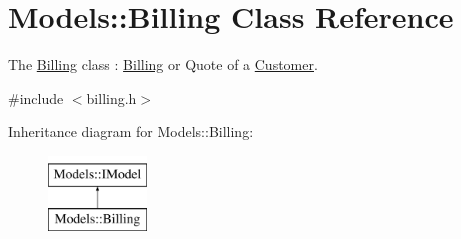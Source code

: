 \hypertarget{classModels_1_1Billing}{\section{Models\-:\-:Billing Class Reference}
\label{classModels_1_1Billing}
}


The \hyperlink{classModels_1_1Billing}{Billing} class \-: \hyperlink{classModels_1_1Billing}{Billing} or Quote of a \hyperlink{classModels_1_1Customer}{Customer}.  




{\ttfamily \#include $<$billing.\-h$>$}

Inheritance diagram for Models\-:\-:Billing\-:\begin{figure}[H]
\begin{center}
\leavevmode
\includegraphics[height=2.000000cm]{d4/d5c/classModels_1_1Billing}
\end{center}
\end{figure}
